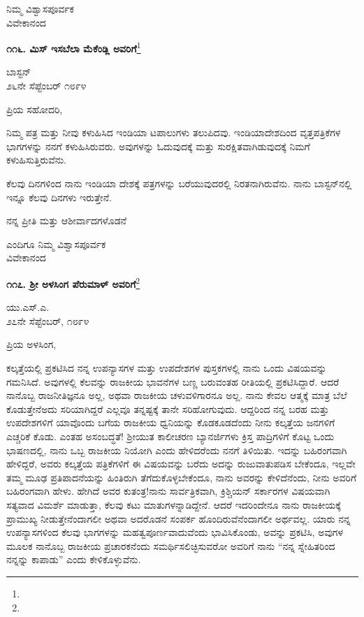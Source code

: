 {\flushright
ನಿಮ್ಮ ವಿಶ್ವಾಸಪೂರ್ವಕ\\ವಿವೇಕಾನಂದ\par}

\begin{center}
\textbf{೧೧೬. ಮಿಸ್ ಇಸಬೆಲಾ ಮೆಕೆಂಡ್ಲಿ ಅವರಿಗೆ}\footnote{}
\end{center}

\begin{flushright}
ಬಾಸ್ಟನ್\\೨೬ನೇ ಸೆಪ್ಟೆಂಬರ್ ೧೮೯೪
\end{flushright}

\noindent
ಪ್ರಿಯ ಸಹೋದರಿ,

ನಿಮ್ಮ ಪತ್ರ ಮತ್ತು ನೀವು ಕಳುಹಿಸಿದ ಇಂಡಿಯಾ ಟಪಾಲುಗಳು ತಲುಪಿದವು. ಇಂಡಿಯಾದೇಶದಿಂದ ವೃತ್ತಪತ್ರಿಕೆಗಳ ಭಾಗಗಳನ್ನು ನನಗೆ ಕಳುಹಿಸಿರುವರು. ಅವುಗಳನ್ನು ಓದುವುದಕ್ಕೆ ಮತ್ತು ಸುರಕ್ಷಿತವಾಗಿಡುವುದಕ್ಕೆ ನಿಮಗೆ ಕಳುಹಿಸುತ್ತಿರುವೆನು.

ಕೆಲವು ದಿನಗಳಿಂದ ನಾನು ಇಂಡಿಯಾ ದೇಶಕ್ಕೆ ಪತ್ರಗಳನ್ನು ಬರೆಯುವುದರಲ್ಲಿ ನಿರತನಾಗಿರುವೆನು. ನಾನು ಬಾಸ್ಟನ್‌ನಲ್ಲಿ ಇನ್ನೂ ಕೆಲವು ದಿನಗಳು ಇರುತ್ತೇನೆ.

ನನ್ನ ಪ್ರೀತಿ ಮತ್ತು ಆಶೀರ್ವಾದಗಳೊಡನೆ

{\flushright
ಎಂದಿಗೂ ನಿಮ್ಮ ವಿಶ್ವಾಸಪೂರ್ವಕ\\ವಿವೇಕಾನಂದ\par}

\begin{center}
\textbf{೧೧೭. ಶ‍್ರೀ ಅಳಸಿಂಗ ಪೆರುಮಾಳ್ ಅವರಿಗೆ}\footnote{}
\end{center}

\begin{flushright}
ಯು.ಎಸ್.ಎ.\\೨೭ನೇ ಸೆಪ್ಟೆಂಬರ್, ೧೮೯೪
\end{flushright}

\noindent
ಪ್ರಿಯ ಅಳಸಿಂಗ,

ಕಲ್ಕತ್ತೆಯಲ್ಲಿ ಪ್ರಕಟಿಸಿದ ನನ್ನ ಉಪನ್ಯಾಸಗಳ ಮತ್ತು ಉಪದೇಶಗಳ ಪುಸ್ತಕಗಳಲ್ಲಿ ನಾನು ಒಂದು ವಿಷಯವನ್ನು ಗಮನಿಸಿದೆ. ಅವುಗಳಲ್ಲಿ ಕೆಲವನ್ನು ರಾಜಕೀಯ ಭಾವನೆಗಳ ಬಣ್ಣ ಬರುವಂತಹ ರೀತಿಯಲ್ಲಿ ಪ್ರಕಟಿಸಿದ್ದಾರೆ. ಆದರೆ ನಾನೊಬ್ಬ ರಾಜನೀತಿಜ್ಞನೂ ಅಲ್ಲ, ಅಥವಾ ರಾಜಕೀಯ ಚಳುವಳಿಗಾರನೂ ಅಲ್ಲ. ನಾನು ಕೇವಲ ಆತ್ಮಕ್ಕೆ ಮಾತ್ರ ಬೆಲೆ ಕೊಡುತ್ತೇನೆ\enginline{-}ಅದು ಸರಿಯಾಗಿದ್ದರೆ ಎಲ್ಲವೂ ತನ್ನಷ್ಟಕ್ಕೆ ತಾನೇ ಸರಿಹೋಗುವುದು. ಆದ್ದರಿಂದ ನನ್ನ ಬರಹ ಮತ್ತು ಉಪದೇಶಗಳಿಗೆ ಯಾವೊಂದು ಬಗೆಯ ರಾಜಕೀಯ ಧ್ವನಿಯನ್ನು ಕೊಡಕೂಡದೆಂದು ನೀನು ಕಲ್ಕತ್ತೆಯ ಜನಗಳಿಗೆ ಎಚ್ಚರಿಕೆ ಕೊಡು. ಎಂತಹ ಅಸಂಬದ್ಧತೆ! ಶ‍್ರೀಯುತ ಕಾಲೀಚರಣ ಬ್ಯಾನರ್ಜಿಗಳು ಕ್ರಿಸ್ತ ಪಾದ್ರಿಗಳಿಗೆ ಕೊಟ್ಟ ಒಂದು ಭಾಷಣದಲ್ಲಿ, ನಾನು ಒಬ್ಬ ರಾಜಕೀಯ ನಿಯೋಗಿ ಎಂದು ಹೇಳಿದರೆಂದು ನನಗೆ ತಿಳಿಯಿತು. ಇದನ್ನು ಬಹಿರಂಗವಾಗಿ ಹೇಳಿದ್ದರೆ, ಅವರು ಕಲ್ಕತ್ತೆಯ ಪತ್ರಿಕೆಗಳಿಗೆ ಈ ವಿಷಯವನ್ನು ಬರೆದು ಅದನ್ನು ರುಜುವಾತುಪಡಿಸ ಬೇಕೆಂದೂ, ಇಲ್ಲವೇ ತಮ್ಮ ಮೂಢ ಪ್ರತಿಪಾದನೆಯನ್ನು ಹಿಂತಿರುಗಿ ತೆಗೆದುಕೊಳ್ಳಬೇಕೆಂದೂ, ನಾನು ಅವರನ್ನು ಕೇಳಿದೆನೆಂದು, ನೀನು ಅವರಿಗೆ ಬಹಿರಂಗವಾಗಿ ಹೇಳು. ಹೇಗಿದೆ ಅವರ ಕುತಂತ್ರ!ನಾನು ಸಾರ್ವತ್ರಿಕವಾಗಿ, ಕ್ರಿಶ್ಚಿಯನ್ ಸರ್ಕಾರಗಳ ವಿಷಯವಾಗಿ ಸತ್ಯವಾದ ವಿಮರ್ಶೆ ಮಾಡುತ್ತಾ, ಕೆಲವು ಕಟು ಮಾತುಗಳನ್ನಾಡಿದ್ದೇನೆ. ಆದರೆ ಇದರಿಂದೇನೂ ನಾನು ರಾಜಕೀಯಕ್ಕೆ ಪ್ರಾಮುಖ್ಯ ನೀಡುತ್ತೇನೆಂದಾಗಲೀ ಅಥವಾ ಅದರೊಡನೆ ಸಂಪರ್ಕ ಹೊಂದಿರುವೆನೆಂದಾಗಲೀ ಅರ್ಥವಲ್ಲ. ಯಾರು ನನ್ನ ಉಪನ್ಯಾಸಗಳಿಂದ ಕೆಲವು ಭಾಗಗಳನ್ನು ಮಹತ್ವಪೂರ್ಣವಾದುವೆಂದು ಭಾವಿಸಿಕೊಂಡು, ಅವನ್ನು ಪ್ರಕಟಿಸಿ, ಅವುಗಳ ಮೂಲಕ ನಾನೊಬ್ಬ ರಾಜಕೀಯ ಪ್ರಚಾರಕನೆಂದು ಸಮರ್ಥಿಸಲಿಚ್ಛಿಸುವರೋ ಅವರಿಗೆ ನಾನು “ನನ್ನ ಸ್ನೇಹಿತರಿಂದ ನನ್ನನ್ನು ಕಾಪಾಡು” ಎಂದು ಕೇಳಿಕೊಳ್ಳುವೆನು.

